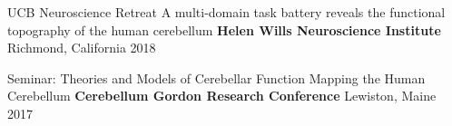 \begin{cventries}
  \cventry
    {UCB Neuroscience Retreat} %
    {A multi-domain task battery reveals the functional topography of the human cerebellum} %
    {\textbf{Helen Wills Neuroscience Institute}}
    {Richmond, California} %
    {2018} %
    
  \cventry
    {Seminar: Theories and Models of Cerebellar Function} %
    {Mapping the Human Cerebellum} %
    {\textbf{Cerebellum Gordon Research Conference}} %
    {Lewiston, Maine} %
    {2017} %
   
\end{cventries}
